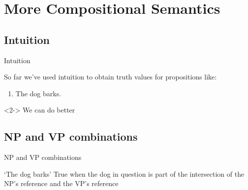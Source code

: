 \documentclass{beamer}
\subtitle[More Compositional Semantics]{More Compositional Semantics}
\newcommand{\suboneone}{Intuition}
\newcommand{\subonetwo}{NP and VP combinations}
\begin{document}
  

  \section{More Compositional Semantics}
    \subsection{\suboneone}
      \begin{frame}{\suboneone}
        \begin{block}{}
          So far we've used intuition to obtain truth values for propositions like:
          \begin{enumerate}
            \item The dog barks.
          \end{enumerate}
        \end{block}
        \begin{block}<2->{}
          We can do better
        \end{block}
      \end{frame}

    \subsection{\subonetwo}
      \begin{frame}{\subonetwo}
        \begin{block}{`The dog barks'}
          True when the dog in question is part of the intersection of the NP's reference and the VP's reference
        \end{block}
        \begin{center}
        \end{center}
      \end{frame}
\end{document}
